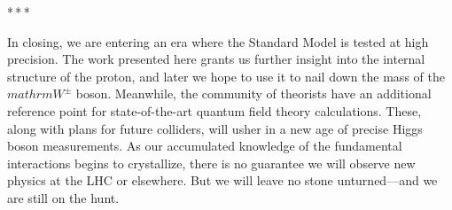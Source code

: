 \bigskip\par\centerline{*\,*\,*}\medskip\par

In closing, we are entering an era where the Standard Model is tested at high precision.
The work presented here grants us further insight into the internal structure of the proton, and later we hope to use it to nail down the mass of the $mathrm{W^\pm}$ boson.
Meanwhile, the community of theorists have an additional reference point for state-of-the-art quantum field theory calculations.
These, along with plans for future colliders, will usher in a new age of precise Higgs boson measurements.
As our accumulated knowledge of the fundamental interactions begins to crystallize, there is no guarantee we will observe new physics at the LHC or elsewhere.
But we will leave no stone unturned---and we are still on the hunt.

